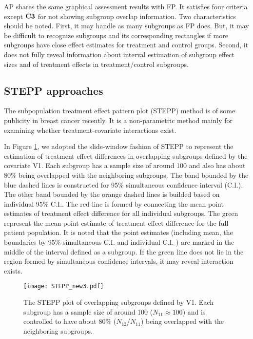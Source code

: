 \documentclass[Afour,sagev,times, doublespace]{sagej}
\begin{document}
{AP shares the same graphical assessment results with FP. It satisfies four criteria except $\bf C3$ for not showing subgroup overlap information.
Two characteristics should be noted. First, it may handle as many subgroups as FP does. But, it may be difficult to recognize subgroups and its corresponding rectangles if more subgroups have close effect estimates for treatment and control groups. Second, it does not fully reveal information about interval estimation of subgroup effect sizes and of treatment effects in treatment/control subgroups.

\subsection{STEPP approaches}	

The subpopulation treatment effect pattern plot (STEPP) method \cite{bonetti:04, bonetti:00} is of some publicity in breast cancer recently. It is a non-parametric method mainly for examining whether treatment-covariate interactions exist. %

 In Figure \ref{fig:STEPP}, we adopted the slide-window fashion of STEPP to represent the estimation of treatment effect differences in overlapping subgroups defined by the covariate V1. Each subgroup has a sample size of around 100 and also has about 80$\%$ being overlapped with the neighboring subgroups. The band bounded by the blue dashed lines is constructed for 95$\%$ simultaneous confidence interval (C.I.). The other band bounded by the orange dashed lines is builded based on individual 95$\%$ C.I.. The red line is formed by connecting the mean point estimates of treatment effect difference for all individual subgroups. The green represent the mean point estimate of treatment effect difference for the full patient population. It is noted that the point estimates (including mean, the boundaries by 95$\%$ simultaneous C.I. and individual C.I. ) are marked in the middle of the interval defined as a subgroup. If the green line does not lie in the region formed by simultaneous confidence intervals, it may reveal interaction exists.

\begin{figure}%
\begin{center}
		\texttt{[image: STEPP\_new3.pdf]} \\
		\caption{The STEPP plot of overlapping subgroups defined by V1. Each subgroup has a sample size of around 100 ($N_{11} \approx 100$) and is controlled to have about 80$\%$ ($N_{12}$/$N_{11}$) being overlapped with the neighboring subgroups.}\label{fig:STEPP}
\end{center}
\end{figure}

}
\end{document}
